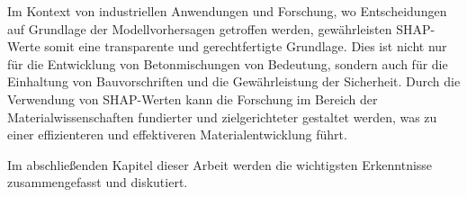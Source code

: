 Im Kontext von industriellen Anwendungen und Forschung, wo Entscheidungen auf Grundlage 
der Modellvorhersagen getroffen werden, gewährleisten SHAP-Werte somit eine transparente 
und gerechtfertigte Grundlage. Dies ist nicht nur für die Entwicklung von Betonmischungen 
von Bedeutung, sondern auch für die Einhaltung von Bauvorschriften und die Gewährleistung 
der Sicherheit. Durch die Verwendung von SHAP-Werten kann die Forschung im Bereich 
der Materialwissenschaften fundierter und zielgerichteter gestaltet werden, was zu einer 
effizienteren und effektiveren Materialentwicklung führt.

Im abschließenden Kapitel dieser Arbeit werden die wichtigsten Erkenntnisse zusammengefasst 
und diskutiert.

